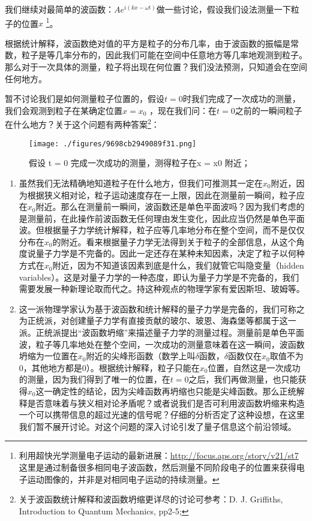 我们继续对最简单的波函数：$A e^{i(kx - \omega t)}
$做一些讨论，假设我们设法测量一下粒子的位置$x$
\footnote{利用超快光学测量电子运动的最新进展：\url{http://focus.aps.org/story/v21/st7}
这里是通过制备很多相同电子波函数，然后测量不同阶段电子的位置来获得电子运动图像的，并非是对相同电子运动的持续测量。}。

根据统计解释，波函数绝对值的平方是粒子的分布几率，由于波函数的振幅是常数，粒子是等几率分布的，因此我们可能在空间中任意地方等几率地观测到粒子。那么对于一次具体的测量，粒子将出现在何位置？我们没法预测，只知道会在空间任何地方。

暂不讨论我们是如何测量粒子位置的，假设$t=0$时我们完成了一次成功的测量，我们会观测到粒子在某确定位置$x=x_0$
，现在我们问：在$t=0$之前的一瞬间粒子在什么地方？关于这个问题有两种答案\footnote{关于波函数统计解释和波函数坍缩更详尽的讨论可参考：D. J. Griffiths, Introduction to Quantum Mechanics, pp2-5;}：

\begin{figure}[ht]
\centering
\texttt{[image: ./figures/9698cb2949089f31.png]}
\caption{假设 t = 0 完成⼀次成功的测量，测得粒⼦在x = x0 附近；} \label{fig_QMPre7_2}
\end{figure}


\begin{enumerate}
\item 
虽然我们无法精确地知道粒子在什么地方，但我们可推测其一定在$x_0$附近，因为根据狭义相对论，粒子运动速度存在一上限，因此在测量前一瞬间，粒子应在$x_0$附近。那么在测量前一瞬间，波函数还是单色平面波吗？因为我们考虑的是测量前，在此操作前波函数无任何理由发生变化，因此应当仍然是单色平面波。但根据量子力学统计解释，粒子应等几率地分布在整个空间，而不是仅仅分布在$x_0$的附近。看来根据量子力学无法得到关于粒子的全部信息，从这个角度说量子力学是不完备的。因此一定还存在某种未知因素，决定了粒子以何种方式在$x_0$附近，因为不知道该因素到底是什么，我们就管它叫隐变量（hidden variables）。这是对量子力学的一种态度，即认为量子力学是不完备的，我们需要发展一种新理论取而代之。持这种观点的物理学家有爱因斯坦、玻姆等。

\item

这一派物理学家认为基于波函数和统计解释的量子力学是完备的，我们可称之为正统派，对创建量子力学有直接贡献的玻尔、玻恩、海森堡等都属于这一派。正统派提出“波函数坍缩”来描述量子力学的测量过程。测量前是单色平面波，粒子等几率地处在整个空间，一次成功的测量意味着在这一瞬间，波函数坍缩为一位置在$x_0$附近的尖峰形函数（数学上叫$\delta$函数，$\delta$函数仅在$x_0$取值不为0，其他地方都是0）。根据统计解释，粒子只能在$x_0$位置，自然这是一次成功的测量，因为我们得到了唯一的位置，在$t=0$之后，我们再做测量，也只能获得$x_0$这一确定性的结论，因为尖峰函数再坍缩也只能是尖峰函数。那么正统解释是否意味着与狭义相对论矛盾呢？或者说我们是否可利用波函数坍缩来构造一个可以携带信息的超过光速的信号呢？仔细的分析否定了这种设想，在这里我们暂不展开讨论。对这个问题的深入讨论引发了量子信息这个前沿领域。

\end{enumerate}

